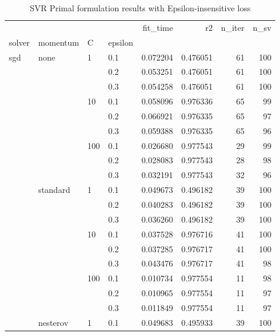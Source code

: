 \begin{table}[H]
\centering
\caption{SVR Primal formulation results with Epsilon-insensitive loss}
\label{primal_svr_eps_cv_results}
\begin{tabular}{llllrrrr}
\toprule
          &   &     &     &  fit\_time &        r2 &  n\_iter &  n\_sv \\
solver & momentum & C & epsilon &           &           &         &       \\
\midrule
sgd & none & 1   & 0.1 &  0.072204 &  0.476051 &      61 &   100 \\
          &   &     & 0.2 &  0.053251 &  0.476051 &      61 &   100 \\
          &   &     & 0.3 &  0.054258 &  0.476051 &      61 &   100 \\
          &   & 10  & 0.1 &  0.058096 &  0.976336 &      65 &    99 \\
          &   &     & 0.2 &  0.066921 &  0.976335 &      65 &    97 \\
          &   &     & 0.3 &  0.059388 &  0.976335 &      65 &    96 \\
          &   & 100 & 0.1 &  0.026680 &  0.977543 &      29 &    99 \\
          &   &     & 0.2 &  0.028083 &  0.977543 &      28 &    98 \\
          &   &     & 0.3 &  0.032191 &  0.977543 &      32 &    96 \\
          & standard & 1   & 0.1 &  0.049673 &  0.496182 &      39 &   100 \\
          &   &     & 0.2 &  0.040283 &  0.496182 &      39 &   100 \\
          &   &     & 0.3 &  0.036260 &  0.496182 &      39 &   100 \\
          &   & 10  & 0.1 &  0.037528 &  0.976716 &      41 &   100 \\
          &   &     & 0.2 &  0.037285 &  0.976717 &      41 &   100 \\
          &   &     & 0.3 &  0.043476 &  0.976717 &      41 &    98 \\
          &   & 100 & 0.1 &  0.010734 &  0.977554 &      11 &    98 \\
          &   &     & 0.2 &  0.010965 &  0.977554 &      11 &    97 \\
          &   &     & 0.3 &  0.011849 &  0.977554 &      11 &    97 \\
          & nesterov & 1   & 0.1 &  0.049683 &  0.495933 &      39 &   100 \\

\end{tabular}
\end{table}
